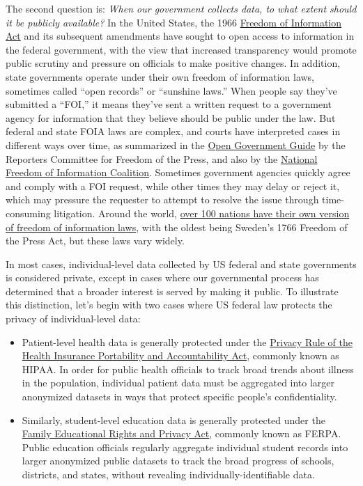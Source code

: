\documentclass[
  english,
]{book}
\begin{document}
The second question is: \emph{When our government collects data, to what extent should it be publicly available?} In the United States, the 1966 \href{https://en.wikipedia.org/wiki/Freedom_of_Information_Act}{Freedom of Information Act} and its subsequent amendments have sought to open access to information in the federal government, with the view that increased transparency would promote public scrutiny and pressure on officials to make positive changes. In addition, state governments operate under their own freedom of information laws, sometimes called ``open records'' or ``sunshine laws.'' When people say they've submitted a ``FOI,'' it means they've sent a written request to a government agency for information that they believe should be public under the law. But federal and state FOIA laws are complex, and courts have interpreted cases in different ways over time, as summarized in the \href{https://www.rcfp.org/open-government-guide/}{Open Government Guide} by the Reporters Committee for Freedom of the Press, and also by the \href{https://www.nfoic.org/}{National Freedom of Information Coalition}. Sometimes government agencies quickly agree and comply with a FOI request, while other times they may delay or reject it, which may pressure the requester to attempt to resolve the issue through time-consuming litigation. Around the world, \href{https://en.wikipedia.org/wiki/Freedom_of_information_laws_by_country}{over 100 nations have their own version of freedom of information laws}, with the oldest being Sweden's 1766 Freedom of the Press Act, but these laws vary widely.

In most cases, individual-level data collected by US federal and state governments is considered private, except in cases where our governmental process has determined that a broader interest is served by making it public. To illustrate this distinction, let's begin with two cases where US federal law protects the privacy of individual-level data:

\begin{itemize}
\item
  Patient-level health data is generally protected under the \href{https://en.wikipedia.org/wiki/Health_Insurance_Portability_and_Accountability_Act\#Privacy_Rule}{Privacy Rule of the Health Insurance Portability and Accountability Act}, commonly known as HIPAA. In order for public health officials to track broad trends about illness in the population, individual patient data must be aggregated into larger anonymized datasets in ways that protect specific people's confidentiality.
\item
  Similarly, student-level education data is generally protected under the \href{https://en.wikipedia.org/wiki/Family_Educational_Rights_and_Privacy_Act}{Family Educational Rights and Privacy Act}, commonly known as FERPA. Public education officials regularly aggregate individual student records into larger anonymized public datasets to track the broad progress of schools, districts, and states, without revealing individually-identifiable data.
\end{itemize}
\end{document}
